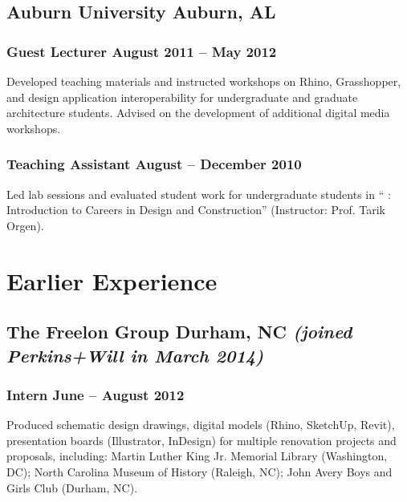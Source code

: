 \documentclass[letterpaper, oneside, 10pt]{article}
\begin{document}
\setlength{\pagetotal}{\pagetotal - 12em}

\subsection*{Auburn University\DotSep{0.25em} Auburn, AL}

\subsubsection*{Guest Lecturer\DotSep{0.25em} August 2011 -- May 2012}

Developed teaching materials and instructed workshops on Rhino, Grasshopper,
and design application interoperability for undergraduate and graduate
architecture students. Advised on the development of additional digital media
workshops.

\subsubsection*{Teaching Assistant\DotSep{0.25em} August -- December 2010}

Led lab sessions and evaluated student work for undergraduate students in
`` : Introduction to Careers in Design and Construction''
(Instructor: Prof. Tarik Orgen).

\suppresstrue

\section*{Earlier Experience} %

\AdjSectSpace
\suppressfalse

\subsection*{%
  The Freelon Group\DotSep{0.25em} Durham, NC\DotSep{0.25em}%
  \space\textit{(joined Perkins+Will in March 2014)}%
}

\subsubsection*{Intern\DotSep{0.25em} June -- August 2012}

Produced schematic design drawings, digital models (Rhino, SketchUp, Revit),
presentation boards (Illustrator, InDesign) for multiple renovation projects
and proposals, including: Martin Luther King Jr. Memorial Library (Washington,
DC); North Carolina Museum of History (Raleigh, NC); John Avery Boys and Girls
Club (Durham, NC).
\end{document}
